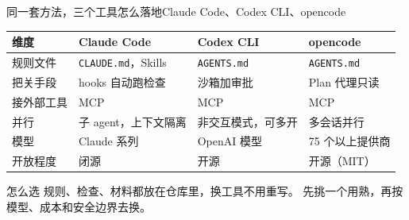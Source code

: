 \documentclass[aspectratio=169]{beamer}
\begin{document}
\begin{frame}{同一套方法，三个工具怎么落地}{Claude Code、Codex CLI、opencode}
  \begin{center}
  \footnotesize
  \begin{tabular}{llll}
    \toprule
    \textbf{维度} & \textbf{Claude Code} & \textbf{Codex CLI} & \textbf{opencode} \\
    \midrule
    规则文件 & \texttt{CLAUDE.md}，Skills & \texttt{AGENTS.md} & \texttt{AGENTS.md} \\
    把关手段 & hooks 自动跑检查 & 沙箱加审批 & Plan 代理只读 \\
    接外部工具 & MCP & MCP & MCP \\
    并行 & 子 agent，上下文隔离 & 非交互模式，可多开 & 多会话并行 \\
    模型 & Claude 系列 & OpenAI 模型 & 75 个以上提供商 \\
    开放程度 & 闭源 & 开源 & 开源（MIT） \\
    \bottomrule
  \end{tabular}
  \end{center}
  \begin{block}{怎么选}
    规则、检查、材料都放在仓库里，换工具不用重写。
    先挑一个用熟，再按模型、成本和安全边界去换。
  \end{block}
\end{frame}
\end{document}
